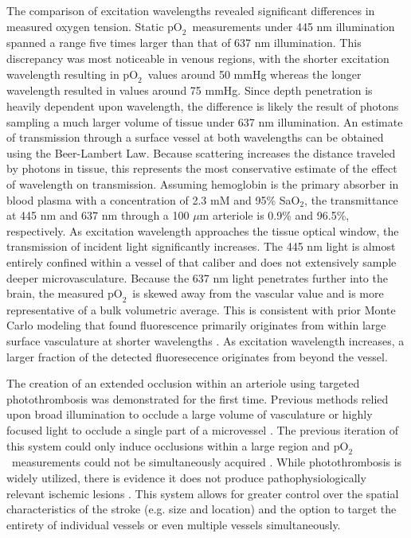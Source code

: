 \documentclass[12pt]{spieman}  %
\newcommand{\pO}{\ensuremath{\text{pO}_2}}
\begin{document}
\begin{spacing}{2}
The comparison of excitation wavelengths revealed significant differences in measured oxygen tension. Static \pO\ measurements under 445 nm illumination spanned a range five times larger than that of 637 nm illumination. This discrepancy was most noticeable in venous regions, with the shorter excitation wavelength resulting in \pO\ values around 50 mmHg whereas the longer wavelength resulted in values around 75 mmHg. Since depth penetration is heavily dependent upon wavelength\cite{Deng:2003kb}, the difference is likely the result of photons sampling a much larger volume of tissue under 637 nm illumination. An estimate of transmission through a surface vessel at both wavelengths can be obtained using the Beer-Lambert Law. Because scattering increases the distance traveled by photons in tissue, this represents the most conservative estimate of the effect of wavelength on transmission. Assuming hemoglobin is the primary absorber in blood plasma with a concentration of 2.3 mM \cite{Robles:2010cw} and 95\% SaO$_{2}$, the transmittance at 445 nm and 637 nm through a 100 $\mu$m arteriole is 0.9\% and 96.5\%, respectively. As excitation wavelength approaches the tissue optical window, the transmission of incident light significantly increases. The 445 nm light is almost entirely confined within a vessel of that caliber and does not extensively sample deeper microvasculature. Because the 637 nm light penetrates further into the brain, the measured \pO\ is skewed away from the vascular value and is more representative of a bulk volumetric average. This is consistent with prior Monte Carlo modeling that found fluorescence primarily originates from within large surface vasculature at shorter wavelengths \cite{Davis:2011wj}. As excitation wavelength increases, a larger fraction of the detected fluoresecence originates from beyond the vessel.

The creation of an extended occlusion within an arteriole using targeted photothrombosis was demonstrated for the first time. Previous methods relied upon broad illumination to occlude a large volume of vasculature \cite{Watson:1985bp} or highly focused light to occlude a single part of a microvessel \cite{Schaffer:2006fb}. The previous iteration of this system could only induce occlusions within a large region and \pO\ measurements could not be simultaneously acquired \cite{Ponticorvo:2010uv}. While photothrombosis is widely utilized, there is evidence it does not produce pathophysiologically relevant ischemic lesions \cite{Carmichael:2005gk}. This system allows for greater control over the spatial characteristics of the stroke (e.g. size and location) and the option to target the entirety of individual vessels or even multiple vessels simultaneously.


\end{spacing}
\end{document}
